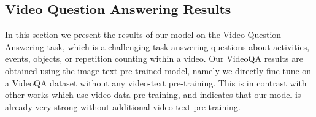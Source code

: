 \documentclass[10pt]{article} \usepackage[accepted]{tmlr}
\newcommand{\ours}{MaMMUT\xspace}
\begin{document}
 \begin{comment}
 
 \subsection{Image Captioning Results}
 \label{sec:cap}

Table~\ref{tab:results_cap} shows \ours performance on the Image Captioning task on the MS-COCO Captioning benchmark~\citep{chen2015cococaptions}. 
Similarly, to the results on VQA, here too, models such as PaLI~\citep{pali} and GIT/GIT2~\citep{wang2022git} outperform our method.

 \begin{table}[t]
 \centering
 \small
\begin{tabular}{l|c|c}
Method   & CIDEr &Bleu \\ 
 \hline
 BLIP~\citep{li2022blip} &136.7 &40.4\\
 Flamingo-80B~\citep{flamingo} &138.1 &- \\
LEMON-Huge~\citep{lemon} &139.1 &41.5\\
 VinVL~\citep{VinVL} &140.9 & 41.0\\
 CoCa~\citep{yu2022coca} &143.6 &40.9\\
 GIT~\citep{wang2022git} &144.8 &44.1 \\
 GIT2~\citep{wang2022git} &145.0 &\textbf{44.1} \\
PaLI-3B~\citep{pali} &145.4 &- \\
 PaLI-17B~\citep{pali} &\textbf{149.1} &- \\
 \hline
 \bf{\ours (ours)}   & 136.8 & 38.3 \\
 \hline
\end{tabular}
 \caption{\textbf{Image Captioning.} Performance on the Image Captioning Dataset evaluated on the MS-COCO dataset.}
 \label{tab:results_cap}
 \vspace{-2mm}
 \end{table}

 \end{comment} 

\vspace{-1mm}
\subsection{Video Question Answering Results}
\label{sec:video}

In this section we present the results of our model on the Video Question Answering task, which is a challenging task answering questions about activities, events, objects, or repetition counting within a video. Our VideoQA results are obtained using the image-text pre-trained model, namely we directly fine-tune on a VideoQA dataset without any video-text pre-training. This is in contrast with other works which use video data pre-training, and indicates that our model is already very strong without additional video-text pre-training.  
\end{document}
